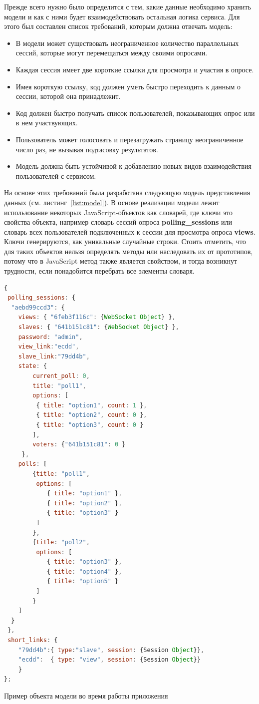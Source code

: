 Прежде всего нужно было определится с тем, какие данные необходимо хранить модели и как с ними будет взаимодействовать остальная логика сервиса. Для этого был составлен список требований, которым должна отвечать модель:
 
\begin{itemize}
 \item В модели может существовать неограниченное количество параллельных сессий, которые могут перемещаться между своими опросами.
 \item Каждая сессия имеет две короткие ссылки для просмотра и участия в опросе. 
 \item Имея короткую ссылку, код должен уметь быстро переходить к данным о сессии, которой она принадлежит.
 \item Код должен быстро получать список пользователей, показывающих опрос или в нем участвующих.
 \item Пользователь может голосовать и перезагружать страницу неограниченное число раз, не вызывая подтасовку результатов.
 \item Модель должна быть устойчивой к добавлению новых видов взаимодействия пользователей с сервисом.
\end{itemize}
 
На основе этих требований была разработана следующую модель представления данных (см. листинг~\ref{list:model}). В основе реализации модели лежит использование некоторых JavaScript-объектов как словарей, где ключи это свойства объекта, например словарь сессий опроса \textbf{polling\_sessions} или словарь всех пользователей подключенных к сессии для просмотра опроса \textbf{views}. Ключи генерируются, как уникальные случайные строки. Стоить отметить, что для таких объектов нельзя определять методы или наследовать их от прототипов, потому что в JavaScript метод также является свойством, и тогда возникнут трудности, если понадобится перебрать все элементы словаря. 
 
\begin{ListingEnv}
\begin{lstlisting}[language=JavaScript]
{
 polling_sessions: {
  "aebd99ccd3": {
	views: { "6feb3f116c": {WebSocket Object} },
	slaves: { "641b151c81": {WebSocket Object} },
	password: "admin",
	view_link:"ecdd",
	slave_link:"79dd4b",
	state: {
		current_poll: 0,
		title: "poll1",
		options: [
		 { title: "option1", count: 1 },
		 { title: "option2", count: 0 },
		 { title: "option3", count: 0 }
		],
		voters: {"641b151c81": 0 }
	 },
	polls: [
		{title: "poll1",
		 options: [
		 	{ title: "option1" },
			{ title: "option2" },
			{ title: "option3" }
		 ]
		},
		{title: "poll2",
		 options: [
			{ title: "option3" },
			{ title: "option4" },
			{ title: "option5" }
		 ]
		}
	]
  }
 },
 short_links: {
	"79dd4b":{ type:"slave", session: {Session Object}},
	"ecdd":	 { type: "view", session: {Session Object}}
	}
};
\end{lstlisting}
\caption{Пример объекта модели во время работы приложения}
\label{list:model}
\end{ListingEnv}
 
